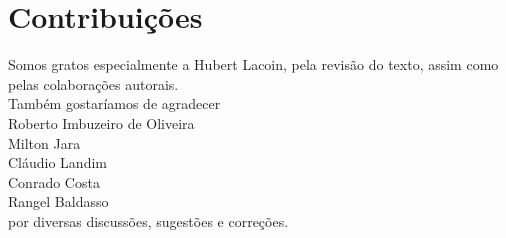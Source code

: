 \chapter*{Contribuições}

Somos gratos especialmente a Hubert Lacoin, pela revisão do texto, assim como pelas colaborações autorais.\\

\noindent
Também gostaríamos de agradecer\\

\noindent
Roberto Imbuzeiro de Oliveira\\
Milton Jara\\
Cláudio Landim\\
Conrado Costa\\
Rangel Baldasso\\

\noindent
por diversas discussões, sugestões e correções.
